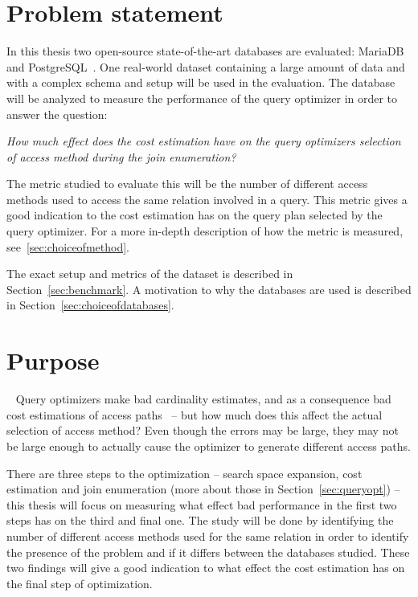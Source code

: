 \section{Problem statement}
In this thesis two open-source state-of-the-art databases are evaluated:
MariaDB~\cite{mariadb_m} and PostgreSQL~\cite{postgresql_ptwmaosd}. One
real-world dataset containing a large amount of data and with a complex schema
and setup will be used in the evaluation. The database will be analyzed to
measure the performance of the query optimizer in order to answer the question:

\textit{How much effect does the cost estimation have on the query optimizers
  selection of access method during the join enumeration?}

The metric studied to evaluate this will be the number of different access methods
used to access the same relation involved in a query. This metric gives a good
indication to the cost estimation has on the query plan selected by
the query optimizer. For a more in-depth description of how the metric is
measured, see~\ref{sec:choiceofmethod}.

The exact setup and metrics of the dataset is described in
Section~\ref{sec:benchmark}. A motivation to why the databases are used is
described in Section~\ref{sec:choiceofdatabases}.

\section{Purpose}~\label{sec:purpose}
Query optimizers make bad cardinality estimates, and as a consequence bad cost
estimations of access paths~\cite{leis_2015_how_hgaqor} – but how much does this
affect the actual selection of access method? Even though the errors may be large,
they may not be large enough to actually cause the optimizer to generate
different access paths.

There are three steps to the optimization – search space expansion, cost
estimation and join enumeration (more about those in Section~\ref{sec:queryopt})
– this thesis will focus on measuring what effect bad performance in the first
two steps has on the third and final one. The study will be done by identifying
the number of different access methods used for the same relation in
order to identify the presence of the problem and if it differs between the
databases studied. These two findings will give a good indication to what effect
the cost estimation has on the final step of optimization.

